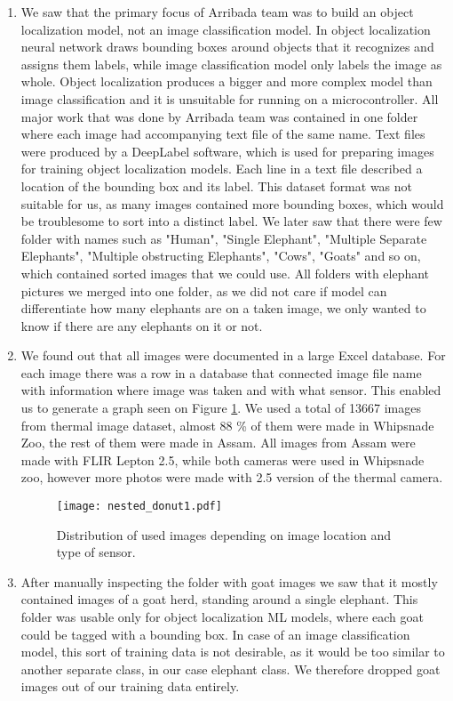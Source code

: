 \begin{enumerate}
    \item We saw that the primary focus of Arribada team was to build an object localization model, not an image classification model.
In object localization neural network draws bounding boxes around objects that it recognizes and assigns them labels, while image classification model only labels the image as whole.
Object localization produces a bigger and more complex model than image classification and it is unsuitable for running on a microcontroller.
All major work that was done by Arribada team was contained in one folder where each image had accompanying text file of the same name.
Text files were produced by a DeepLabel software, which is used for preparing images for training object localization models.
Each line in a text file described a location of the bounding box and its label.
This dataset format was not suitable for us, as many images contained more bounding boxes, which would be troublesome to sort into a distinct label.
We later saw that there were few folder with names such as "Human", "Single Elephant", "Multiple Separate Elephants", "Multiple obstructing Elephants", "Cows", "Goats" and so on, which contained sorted images that we could use.
All folders with elephant pictures we merged into one folder, as we did not care if model can differentiate how many elephants are on a taken image, we only wanted to know if there are any elephants on it or not.

    \item We found out that all images were documented in a large Excel database.
For each image there was a row in a database that connected image file name with information where image was taken and with what sensor.
This enabled us to generate a graph seen on Figure \ref{nested_donut1}.
We used a total of 13667 images from thermal image dataset, almost 88 \% of them were made in Whipsnade Zoo, the rest of them were made in Assam.
All images from Assam were made with FLIR Lepton 2.5, while both cameras were used in Whipsnade zoo, however more photos were made with 2.5 version of the thermal camera.

\begin{figure}[ht]
    \centering
    \texttt{[image: nested\_donut1.pdf]} 
    \caption{Distribution of used images depending on image location and type of sensor.}
    \label{nested_donut1}
\end{figure}

    \item After manually inspecting the folder with goat images we saw that it mostly contained images of a goat herd, standing around a single elephant.
This folder was usable only for object localization ML models, where each goat could be tagged with a bounding box. 
In case of an image classification model, this sort of training data is not desirable, as it would be too similar to another separate class, in our case elephant class.
We therefore dropped goat images out of our training data entirely.


\end{enumerate}
